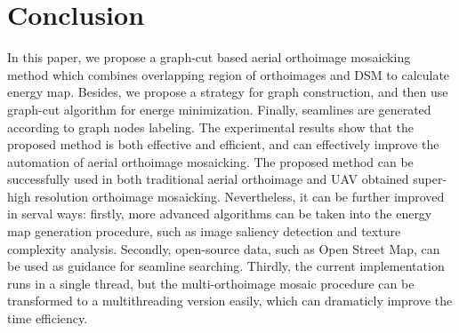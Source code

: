 \documentclass[journal]{IEEEtran}
\begin{document}
\section{Conclusion}
In this paper, we propose a graph-cut based aerial orthoimage mosaicking method which combines overlapping region of orthoimages and DSM to calculate energy map. Besides, we propose a strategy for graph construction, and then use graph-cut algorithm for energe minimization. Finally, seamlines are generated according to graph nodes labeling. The experimental results show that the proposed method is both effective and efficient, and can effectively improve the automation of aerial orthoimage mosaicking. The proposed method can be successfully used in both traditional aerial orthoimage and UAV obtained super-high resolution orthoimage mosaicking. Nevertheless, it can be further improved in serval ways: firstly, more advanced algorithms can be taken into the energy map generation procedure, such as image saliency detection and texture complexity analysis. Secondly, open-source data, such as Open Street Map, can be used as guidance for seamline searching. Thirdly, the current implementation runs in a single thread, but the multi-orthoimage mosaic procedure can be transformed to a multithreading version easily, which can dramaticly improve the time efficiency.

\ifCLASSOPTIONcaptionsoff
  \newpage
\fi

{
\small


}
\end{document}
